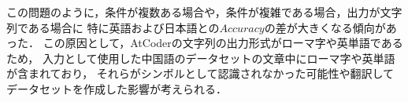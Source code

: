   この問題のように，条件が複数ある場合や，条件が複雑である場合，出力が文字列である場合に
  特に英語および日本語との$Accuracy$の差が大きくなる傾向があった．
  この原因として，AtCoderの文字列の出力形式がローマ字や英単語であるため，
  入力として使用した中国語のデータセットの文章中にローマ字や英単語が含まれており，
  それらがシンボルとして認識されなかった可能性や翻訳してデータセットを作成した影響が考えられる．


  
  
  


